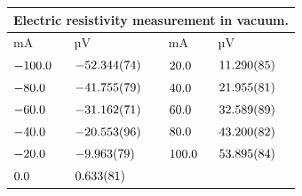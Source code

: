 \begin{tabular}{|p{}|p{}||p{}|p{}|}
\hline
\multicolumn{4}{|c|}{Electric resistivity measurement in vacuum.}\\
\hline
mA&µV&mA&µV\\
\hline
$\num{-100.0\pm 0.0}$&$\num{-52.344\pm 0.074}$&$\num{20.0\pm 0.0}$&$\num{11.29\pm 0.085}$\\
$\num{-80.0\pm 0.0}$&$\num{-41.755\pm 0.079}$&$\num{40.0\pm 0.0}$&$\num{21.955\pm 0.081}$\\
$\num{-60.0\pm 0.0}$&$\num{-31.162\pm 0.071}$&$\num{60.0\pm 0.0}$&$\num{32.589\pm 0.089}$\\
$\num{-40.0\pm 0.0}$&$\num{-20.553\pm 0.096}$&$\num{80.0\pm 0.0}$&$\num{43.2\pm 0.082}$\\
$\num{-20.0\pm 0.0}$&$\num{-9.963\pm 0.079}$&$\num{100.0\pm 0.0}$&$\num{53.895\pm 0.084}$\\
$\num{0.0\pm 0.0}$&$\num{0.633\pm 0.081}$&&\\
\hline
\end{tabular}